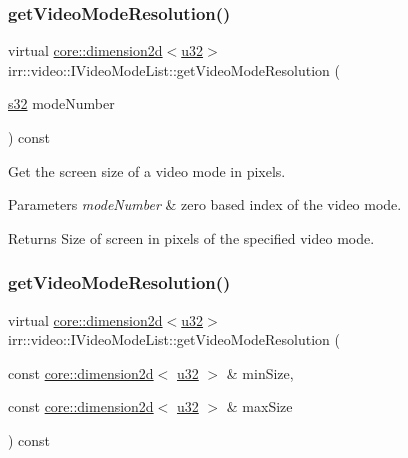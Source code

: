 \subsubsection{\texorpdfstring{get\+Video\+Mode\+Resolution()}{getVideoModeResolution()}\hspace{0.1cm}{\footnotesize\ttfamily [1/2]}}
{\footnotesize\ttfamily virtual \hyperlink{classirr_1_1core_1_1dimension2d}{core\+::dimension2d}$<$\hyperlink{namespaceirr_a0416a53257075833e7002efd0a18e804}{u32}$>$ irr\+::video\+::\+I\+Video\+Mode\+List\+::get\+Video\+Mode\+Resolution (\begin{DoxyParamCaption}\item[{\hyperlink{namespaceirr_ac66849b7a6ed16e30ebede579f9b47c6}{s32}}]{mode\+Number }\end{DoxyParamCaption}) const\hspace{0.3cm}{\ttfamily [pure virtual]}}



Get the screen size of a video mode in pixels. 


\begin{DoxyParams}{Parameters}
{\em mode\+Number} & zero based index of the video mode. \\
\hline
\end{DoxyParams}
\begin{DoxyReturn}{Returns}
Size of screen in pixels of the specified video mode. 
\end{DoxyReturn}
\mbox{\label{classirr_1_1video_1_1IVideoModeList_aa06b5905ac9c04fb38a17bf798fccc9b}} 
\subsubsection{\texorpdfstring{get\+Video\+Mode\+Resolution()}{getVideoModeResolution()}\hspace{0.1cm}{\footnotesize\ttfamily [2/2]}}
{\footnotesize\ttfamily virtual \hyperlink{classirr_1_1core_1_1dimension2d}{core\+::dimension2d}$<$\hyperlink{namespaceirr_a0416a53257075833e7002efd0a18e804}{u32}$>$ irr\+::video\+::\+I\+Video\+Mode\+List\+::get\+Video\+Mode\+Resolution (\begin{DoxyParamCaption}\item[{const \hyperlink{classirr_1_1core_1_1dimension2d}{core\+::dimension2d}$<$ \hyperlink{namespaceirr_a0416a53257075833e7002efd0a18e804}{u32} $>$ \&}]{min\+Size,  }\item[{const \hyperlink{classirr_1_1core_1_1dimension2d}{core\+::dimension2d}$<$ \hyperlink{namespaceirr_a0416a53257075833e7002efd0a18e804}{u32} $>$ \&}]{max\+Size }\end{DoxyParamCaption}) const\hspace{0.3cm}{\ttfamily [pure virtual]}}



